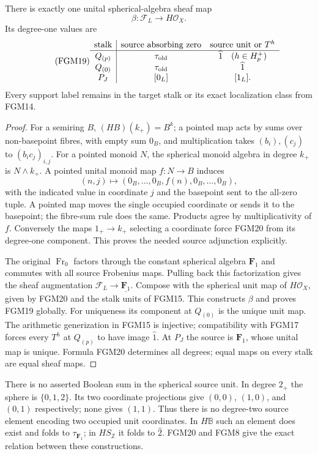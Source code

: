 \begin{theorem}
There is exactly one unital spherical-algebra sheaf map
\begin{equation}\tag{FGM18}
 \beta:\mathcal F_L\longrightarrow H\mathcal O_X.
\end{equation}
Its degree-one values are
\begin{equation}\tag{FGM19}
 \begin{array}{c|cc}
 \text{stalk}&\text{source absorbing zero}&\text{source unit or }T^h\\ \hline
 Q_{(p)}&\tau_{\rm old}&\widehat1\quad(h\in H_p^+)\\
 Q_{(0)}&\tau_{\rm old}&\widehat1\\
 P_J&[0_L]&[1_L].
 \end{array}
\end{equation}
Every support label remains in the target stalk or its exact
localization class from FGM14.
\end{theorem}
\begin{proof}
For a semiring $B$, $(HB)(k_+)=B^k$; a pointed map acts by sums over
non-basepoint fibres, with empty sum $0_B$, and multiplication takes
$(b_i),(c_j)$ to $(b_ic_j)_{i,j}$. For a pointed monoid $N$,
the spherical monoid algebra in degree $k_+$ is $N\wedge k_+$.
A pointed unital monoid map $f:N\to B$ induces
\begin{equation}\tag{FGM20}
 (n,j)\longmapsto(0_B,\ldots,0_B,f(n),0_B,\ldots,0_B),
\end{equation}
with the indicated value in coordinate $j$ and the basepoint sent
to the all-zero tuple. A pointed map moves the single occupied
coordinate or sends it to the basepoint; the fibre-sum rule does the
same. Products agree by multiplicativity of $f$. Conversely the maps
$1_+\to k_+$ selecting a coordinate force FGM20 from its degree-one
component. This proves the needed source adjunction explicitly.

The original $\operatorname{Fr}_0$ factors through the constant
spherical algebra $\mathbf F_1$ and commutes with all source
Frobenius maps. Pulling back this factorization gives the sheaf
augmentation $\mathcal F_L\to\underline{\mathbf F_1}$. Compose
with the spherical unit map of $H\mathcal O_X$, given by FGM20
and the stalk units of FGM15. This constructs $\beta$ and proves
FGM19 globally. For uniqueness its component at $Q_{(0)}$ is the
unique unit map. The arithmetic generization in FGM15 is injective;
compatibility with FGM17 forces every $T^h$ at $Q_{(p)}$ to have
image $\widehat1$. At $P_J$ the source is $\mathbf F_1$, whose
unital map is unique. Formula FGM20 determines all degrees; equal
maps on every stalk are equal sheaf maps.
\end{proof}
There is no asserted Boolean sum in the spherical source unit.
In degree $2_+$ the sphere is $\{0,1,2\}$. Its two coordinate
projections give $(0,0)$, $(1,0)$, and $(0,1)$ respectively;
none gives $(1,1)$. Thus there is no degree-two source element
encoding two occupied unit coordinates. In $H\mathbb B$ such
an element does exist and folds to $\tau_{\mathbf F_1}$; in
$HS_{\mathbb Z}$ it folds to $\widehat2$. FGM20 and FGM8
give the exact relation between these constructions.

